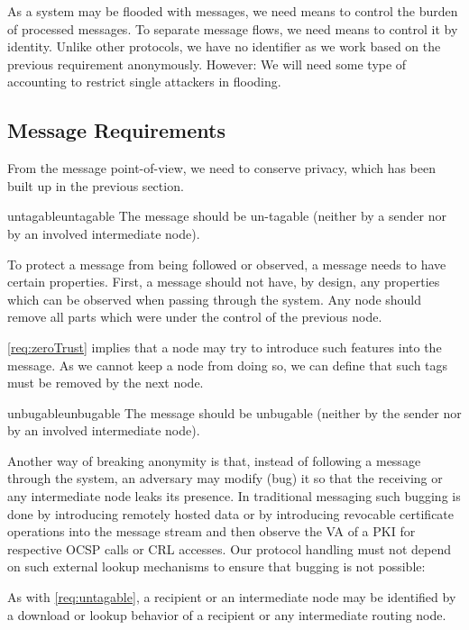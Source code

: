 As a system may be flooded with messages, we need means to control the burden of processed messages. To separate message flows, we need means to control it by identity. Unlike other protocols, we have no identifier as we work based on the previous requirement anonymously. However: We will need some type of accounting to restrict single attackers in flooding.

\subsection{Message Requirements}
From the message point-of-view, we need to conserve privacy, which has been built up in the previous section.

\begin{requirement}{untagable}{untagable}
	The message should be un-tagable (neither by a sender nor by an involved intermediate node).
\end{requirement}

To protect a message from being followed or observed, a message needs to have certain properties. First, a message should not have, by design, any properties which can be observed when passing through the system. Any node should remove all parts which were under the control of the previous node.

\ref{req:zeroTrust} implies that a node may try to introduce such features into the message. As we cannot keep a node from doing so, we can define that such tags must be removed by the next node. 

\begin{requirement}{unbugable}{unbugable}
	The message should be unbugable (neither by the sender nor by an involved intermediate node).
\end{requirement}

Another way of breaking anonymity is that, instead of following a message through the system, an adversary may modify (bug) it so that the receiving or any intermediate node leaks its presence. In traditional messaging such bugging is done by introducing remotely hosted data or by introducing revocable certificate operations into the message stream and then observe the VA of a PKI for respective OCSP calls or CRL accesses. Our protocol handling must not depend on such external lookup mechanisms to ensure that bugging is not possible:

As with \ref{req:untagable}, a recipient or an intermediate node may be identified by a download or lookup behavior of a recipient or any intermediate routing node.  

